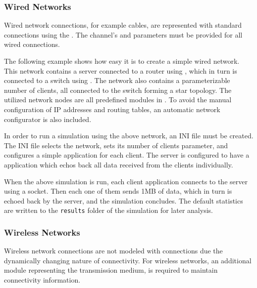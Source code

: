 \subsubsection*{Wired Networks}

Wired network connections, for example  cables, are represented with standard \omnet connections using the . The channel's  and  parameters must be provided for all wired connections.

The following example shows how easy it is to create a simple wired network. This network contains a server connected to a router using , which in turn is connected to a switch using . The network also contains a parameterizable number of clients, all connected to the switch forming a star topology. The utilized network nodes are all predefined modules in \inet. To avoid the manual configuration of IP addresses and routing tables, an automatic network configurator is also included.


In order to run a simulation using the above network, an \omnet INI file must be created. The INI file selects the network, sets its number of clients parameter, and configures a simple  application for each client. The server is configured to have a  application which echos back all data received from the clients individually.


When the above simulation is run, each client application connects to the server using a  socket. Then each one of them sends 1MB of data, which in turn is echoed back by the server, and the simulation concludes. The default statistics are written to the \texttt{results} folder of the simulation for later analysis.

\subsubsection*{Wireless Networks}


Wireless network connections are not modeled with \omnet connections due the dynamically changing nature of connectivity. For wireless networks, an additional module representing the transmission medium, is required to maintain connectivity information.

